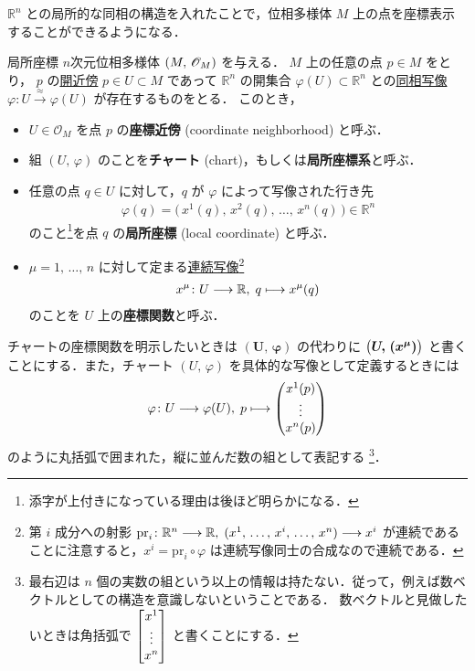 \documentclass[geometry_main]{subfiles}
\begin{document}
$\mathbb{R}^n$ との局所的な同相の構造を入れたことで，位相多様体 $M$ 上の点を座標表示することができるようになる．
\begin{mydef}[label=def.localcoord, breakable]{局所座標}
	$n$次元位相多様体 $(M,\, \mathscr{O}_{M})$ を与える．
	$M$ 上の任意の点 $p \in M$ をとり，
	$p$ の\hyperref[def:neighborhood]{開近傍} $p \in U \subset M$ であって $\mathbb{R}^n$ の開集合 $\varphi(U) \subset \mathbb{R}^n$ との\hyperref[def.homeo]{同相写像} $\varphi \colon U \xrightarrow{\approx} \varphi(U)$ が存在するものをとる．
	このとき，
	\begin{itemize}
		\item $U \in \mathscr{O}_M$ を点 $p$ の\textbf{座標近傍} (coordinate neighborhood) と呼ぶ．
		\item 組 $(U,\, \varphi)$ のことを\textbf{チャート} (chart)，もしくは\textbf{局所座標系}と呼ぶ．
		\item 任意の点 $q \in U$ に対して，$q$ が $\varphi$ によって写像された行き先
		\begin{align}
			\varphi(q) = \bigl(\, x^1(q),\, x^2(q),\, \dots ,\, x^n(q) \,\bigr) \in \mathbb{R}^n
		\end{align}
		のこと\footnote{添字が上付きになっている理由は後ほど明らかになる．}を点 $q$ の\textbf{局所座標} (local coordinate) と呼ぶ．
		\item $\mu = 1,\, \dots ,\, n$ に対して定まる\hyperref[def.continuous]{連続写像}\footnote{第 $i$ 成分への射影 $\mathrm{pr}_i \colon \mathbb{R}^n \longrightarrow \mathbb{R},\; (x^1,\, \dots,\, x^i ,\, \dots,\, x^n) \longrightarrow x^i$ が連続であることに注意すると，$x^i = \mathrm{pr}_i \circ \varphi$ は連続写像同士の合成なので連続である．}
		\begin{align}
			x^\mu \colon U \longrightarrow \mathbb{R},\; q \longmapsto x^\mu(q)
		\end{align}
		のことを $U$ 上の\textbf{座標関数}と呼ぶ．
	\end{itemize}
\end{mydef}

チャートの座標関数を明示したいときは $\bm{(U,\, \varphi)}$ の代わりに $\bm{\bigl(U,\, (x^\mu)\bigr)}$ と書くことにする．また，チャート $(U,\, \varphi)$ を具体的な写像として定義するときには
\begin{align}
	\varphi \colon U \lto \varphi(U), \;
	p \lmto \mqty(x^1(p) \\ \vdots \\ x^n(p))
\end{align}
のように丸括弧で囲まれた，縦に並んだ数の組として表記する
\footnote{
	最右辺は $n$ 個の実数の組という以上の情報は持たない．従って，例えば数ベクトルとしての構造を意識しないということである．
	数ベクトルと見做したいときは角括弧で $\mqty[x^1 \\ \vdots \\ x^n]$ と書くことにする．
}．
\end{document}
